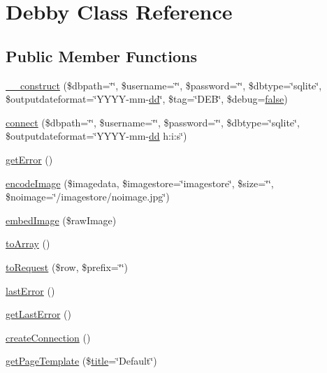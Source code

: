 \hypertarget{classDebby}{}\section{Debby Class Reference}
\label{classDebby}
\subsection*{Public Member Functions}
\begin{DoxyCompactItemize}
\item 
\hyperlink{classDebby_a2dd53fded0dd64090ac538ef66d15bf1}{\+\_\+\+\_\+construct} (\$dbpath=\char`\"{}\char`\"{}, \$username=\char`\"{}\char`\"{}, \$password=\char`\"{}\char`\"{}, \$dbtype=\char`\"{}sqlite\char`\"{}, \$outputdateformat=\char`\"{}Y\+Y\+Y\+Y-\/mm-\/\hyperlink{Shape_8php_ab8bded9253c481cadc72d4df086e52b7}{dd}\char`\"{}, \$tag=\char`\"{}D\+E\+B\char`\"{}, \$debug=\hyperlink{tina4_8php_aec2deb5590a84bee262c3bea206ae88f}{false})
\item 
\hyperlink{classDebby_a9f4e15cca354aa036ac823884c69cb61}{connect} (\$dbpath=\char`\"{}\char`\"{}, \$username=\char`\"{}\char`\"{}, \$password=\char`\"{}\char`\"{}, \$dbtype=\char`\"{}sqlite\char`\"{}, \$outputdateformat=\char`\"{}Y\+Y\+Y\+Y-\/mm-\/\hyperlink{Shape_8php_ab8bded9253c481cadc72d4df086e52b7}{dd} h\+:i\+:s\char`\"{})
\item 
\hyperlink{classDebby_ae9d2704d501f1950be4bf08e4aecc3e7}{get\+Error} ()
\item 
\hyperlink{classDebby_a0480262858a16cfc6e4cfe19b0e29e62}{encode\+Image} (\$imagedata, \$imagestore=\char`\"{}imagestore\char`\"{}, \$size=\char`\"{}\char`\"{}, \$noimage=\char`\"{}/imagestore/noimage.\+jpg\char`\"{})
\item 
\hyperlink{classDebby_af57d83562218d3a4b5e1de2f75a24cf0}{embed\+Image} (\$raw\+Image)
\item 
\hyperlink{classDebby_a4f0f3450a38e497552248a570b395353}{to\+Array} ()
\item 
\hyperlink{classDebby_a07e4bf3f7c9fa77beb52a09a38e936c8}{to\+Request} (\$row, \$prefix=\char`\"{}\char`\"{})
\item 
\hyperlink{classDebby_acbb276a47dbcd64d671a673df43be15a}{last\+Error} ()
\item 
\hyperlink{classDebby_ae10ec43fb6945948e4c936d798cc3bb3}{get\+Last\+Error} ()
\item 
\hyperlink{classDebby_a4cf1bbf921e33fee254129eb77fa4854}{create\+Connection} ()
\item 
\hyperlink{classDebby_ab4c3e5d14a404d1fdd6bc4ab078d64b8}{get\+Page\+Template} (\$\hyperlink{Shape_8php_ad264ad0cabbe965bf7f7c8a5ed6abebb}{title}=\char`\"{}Default\char`\"{})

\end{DoxyCompactItemize}

